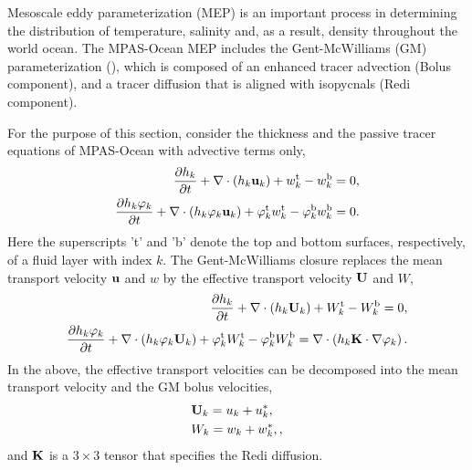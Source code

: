 

Mesoscale eddy parameterization (MEP) is an important process in determining the distribution of temperature, salinity and, as a result, density throughout the world ocean.   The MPAS-Ocean MEP includes the Gent-McWilliams (GM) parameterization (\cite{Gent_McWilliams90jpo,Gent_ea95jpo,Gent2011om}), which is composed of an enhanced tracer advection (Bolus component), and a tracer diffusion that is aligned with isopycnals (Redi component).

For the purpose of this section, consider the thickness and the passive tracer equations of MPAS-Ocean with advective terms only,
\begin{align}   
\dfrac{\partial h_k}{\partial t} 
 + \nabla \cdot \left( h_k {\bf u}_k \right) 
 + w_k^\textrm{t} - w_k^\textrm{b} = 0\label{ocean:GM:1},
\\
\dfrac{\partial h_k\varphi_k}{\partial t} 
 + \nabla \cdot \left( h_k\varphi_k {\bf u}_k \right) 
  + \varphi_k^\textrm{t} w_k^\textrm{t} - \varphi_k^\textrm{b} w_k^\textrm{b}
= 0.\label{ocean:GM:4}
\end{align}
Here the superscripts 't' and 'b' denote the top and bottom surfaces,
respectively, of a fluid layer with index $k$.
The Gent-McWilliams closure replaces the mean transport velocity ${\bf u}$
and $w$ by the effective transport velocity ${\bf U}$ and $W$,
\begin{align}   
\dfrac{\partial h_k}{\partial t} 
 + \nabla \cdot \left( h_k {\bf U}_k \right) 
 + W_k^\textrm{t} - W_k^\textrm{b} = 0,\label{ocean:GM:5}
\\
\dfrac{\partial h_k\varphi_k}{\partial t} 
 + \nabla \cdot \left( h_k\varphi_k{\bf U}_k \right) 
  + \varphi_k^\textrm{t} W_k^\textrm{t} - \varphi_k^\textrm{b} W_k^\textrm{b}  
= \nabla\cdot\left(h_k {\bf K} \cdot \nabla\varphi_k \right).\label{ocean:GM:6}
\end{align}
In the above, the effective transport velocities can be decomposed
into the mean transport velocity and the GM bolus velocities, 
\begin{align}
&{\bf U}_k = u_k + u^\ast_k,\label{ocean:GM:7}\\ 
& W_k = w_k + w^\ast_k,\label{ocean:GM:8},
\end{align}
and ${\bf K}$ is a $3\times 3$ tensor that specifies the Redi diffusion.

